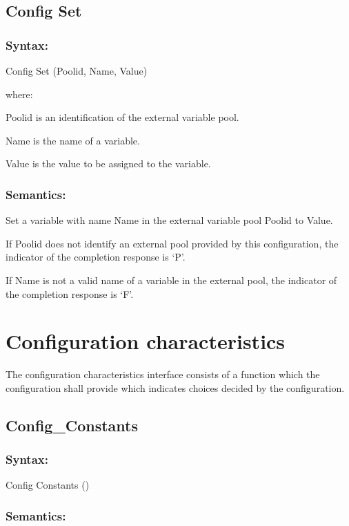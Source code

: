 \subsection{Config Set}\label{config-set}

\subsubsection{Syntax:}\label{syntax-34}

Config Set (Poolid, Name, Value)

where:

Poolid is an identification of the external variable pool.

Name is the name of a variable.

Value is the value to be assigned to the variable.

\subsubsection{Semantics:}\label{semantics-35}

Set a variable with name Name in the external variable pool Poolid to
Value.

If Poolid does not identify an external pool provided by this
configuration, the indicator of the completion response is `P'.

If Name is not a valid name of a variable in the external pool, the
indicator of the completion response is `F'.

\section{Configuration
characteristics}\label{configuration-characteristics}

The configuration characteristics interface consists of a function which
the configuration shall provide which indicates choices decided by the
configuration.

\subsection{Config\_Constants}\label{config_constants}

\subsubsection{Syntax:}\label{syntax-35}

Config Constants ()

\subsubsection{Semantics:}\label{semantics-36}

